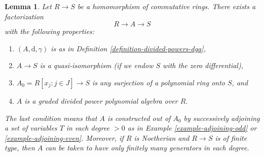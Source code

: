 \documentclass{stacks-project}
\theoremstyle{plain}
\newtheorem{lemma}[subsection]{Lemma}
\theoremstyle{definition}
\theoremstyle{remark}
\numberwithin{equation}{subsection}
\begin{document}
\begin{lemma}
\label{lemma-tate-resolution}
Let $R \to S$ be a homomorphism of commutative rings.
There exists a factorization
$$
R \to A \to S
$$
with the following properties:
\begin{enumerate}
\item $(A, \text{d}, \gamma)$ is as in
Definition \ref{definition-divided-powers-dga},
\item $A \to S$ is a quasi-isomorphism (if we endow $S$ with
the zero differential),
\item $A_0 = R[x_j: j\in J] \to S$ is any surjection of a polynomial
ring onto $S$, and
\item $A$ is a graded divided power polynomial algebra over $R$.
\end{enumerate}
The last condition means that $A$ is constructed out of $A_0$ by
successively adjoining a set of variables $T$ in each degree $> 0$ as in
Example \ref{example-adjoining-odd} or \ref{example-adjoining-even}.
Moreover, if $R$ is Noetherian and $R\to S$ is of finite type,
then $A$ can be taken to have only finitely many generators in
each degree.
\end{lemma}
\end{document}
